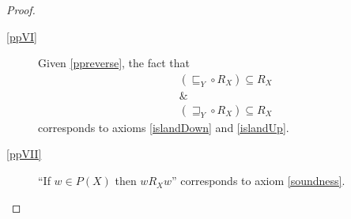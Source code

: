 \begin{proof}
\begin{description}
    \item[\ref{ppVI}] Given \ref{ppreverse}, the fact that
    \begin{eqnarray*}
& (\sqsubseteq_Y \circ R_X) \subseteq R_X \\
& \& \\
&  (\sqsupseteq_Y \circ R_X) \subseteq R_X
\end{eqnarray*}
corresponds to axioms \eqref{islandDown} and \eqref{islandUp}.

    \item[\ref{ppVII}] ``If $w \in P (X)$ then $w R_X w$'' corresponds
      to axiom \eqref{soundness}.

  \end{description}

\end{proof}
